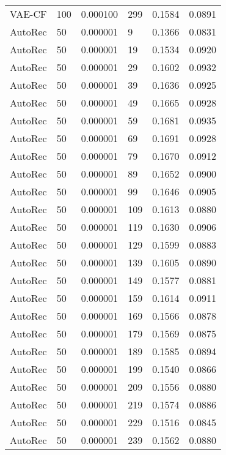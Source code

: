 \begin{tabular}{llrlrr}
  VAE-CF &  100 &  0.000100 &   299 &  0.1584 &       0.0891 \\
 AutoRec &   50 &  0.000001 &     9 &  0.1366 &       0.0831 \\
 AutoRec &   50 &  0.000001 &    19 &  0.1534 &       0.0920 \\
 AutoRec &   50 &  0.000001 &    29 &  0.1602 &       0.0932 \\
 AutoRec &   50 &  0.000001 &    39 &  0.1636 &       0.0925 \\
 AutoRec &   50 &  0.000001 &    49 &  0.1665 &       0.0928 \\
 AutoRec &   50 &  0.000001 &    59 &  0.1681 &       0.0935 \\
 AutoRec &   50 &  0.000001 &    69 &  0.1691 &       0.0928 \\
 AutoRec &   50 &  0.000001 &    79 &  0.1670 &       0.0912 \\
 AutoRec &   50 &  0.000001 &    89 &  0.1652 &       0.0900 \\
 AutoRec &   50 &  0.000001 &    99 &  0.1646 &       0.0905 \\
 AutoRec &   50 &  0.000001 &   109 &  0.1613 &       0.0880 \\
 AutoRec &   50 &  0.000001 &   119 &  0.1630 &       0.0906 \\
 AutoRec &   50 &  0.000001 &   129 &  0.1599 &       0.0883 \\
 AutoRec &   50 &  0.000001 &   139 &  0.1605 &       0.0890 \\
 AutoRec &   50 &  0.000001 &   149 &  0.1577 &       0.0881 \\
 AutoRec &   50 &  0.000001 &   159 &  0.1614 &       0.0911 \\
 AutoRec &   50 &  0.000001 &   169 &  0.1566 &       0.0878 \\
 AutoRec &   50 &  0.000001 &   179 &  0.1569 &       0.0875 \\
 AutoRec &   50 &  0.000001 &   189 &  0.1585 &       0.0894 \\
 AutoRec &   50 &  0.000001 &   199 &  0.1540 &       0.0866 \\
 AutoRec &   50 &  0.000001 &   209 &  0.1556 &       0.0880 \\
 AutoRec &   50 &  0.000001 &   219 &  0.1574 &       0.0886 \\
 AutoRec &   50 &  0.000001 &   229 &  0.1516 &       0.0845 \\
 AutoRec &   50 &  0.000001 &   239 &  0.1562 &       0.0880 \\

\end{tabular}
